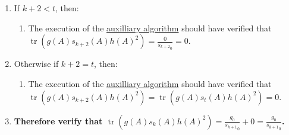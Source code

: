 \documentclass[twocolumn]{article}
\DeclareMathOperator{\tr}{tr}
\begin{document}
\begin{enumerate}
\begin{enumerate}
						\item If $k+2<t$, then:
						\begin{enumerate}
							\item The execution of the \hyperref[sec:algorithm 46 auxilliary algorithm]{auxilliary algorithm} should have verified that $\tr(g(A)s_{k+2}(A)h(A)^2)=\frac{0}{{s_{k+2}}_0}=0$.
						\end{enumerate}
						\item Otherwise if $k+2=t$, then:
						\begin{enumerate}
							\item The execution of the \hyperref[sec:algorithm 46 auxilliary algorithm]{auxilliary algorithm} should have verified that $\tr(g(A)s_{k+2}(A)h(A)^2)=\tr(g(A)s_t(A)h(A)^2)=0$.
						\end{enumerate}
						\item \textbf{Therefore verify that $\tr(g(A)s_k(A)h(A)^2)=\frac{g_0}{{s_{k+1}}_0}+0=\frac{g_0}{{s_{k+1}}_0}$.}
					\end{enumerate}
				\end{enumerate}
\end{document}
